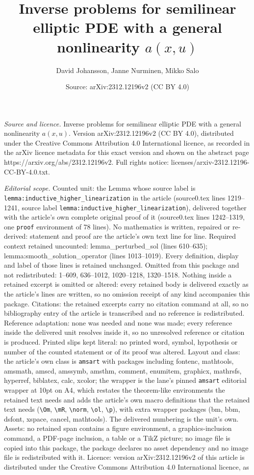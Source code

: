 \documentclass[10pt,a4paper]{amsart}
\title[Inverse problems for semilinear elliptic PDE with a general ]{Inverse problems for semilinear elliptic PDE with a general nonlinearity $a(x,u)$}
\author{David Johansson, Janne Nurminen, Mikko Salo}
\date{Source: arXiv:2312.12196v2 (CC BY 4.0)}
\begin{document}
\maketitle

\noindent\emph{Source and licence.} Inverse problems for semilinear elliptic PDE with a general nonlinearity $a(x,u)$. Version arXiv:2312.12196v2 (CC BY 4.0), distributed under the Creative Commons Attribution 4.0 International licence, as recorded in the arXiv licence metadata for this exact version and shown on the abstract page https://arxiv.org/abs/2312.12196v2. Full rights notice: licenses/arxiv-2312.12196-CC-BY-4.0.txt.\par\smallskip

\noindent\textit{Editorial scope.} Counted unit: the Lemma whose source label is \texttt{lemma:inductive\_higher\_linearization} in the article (source0.tex lines 1219--1241, source label \texttt{lemma:inductive\_higher\_linearization}), delivered together with the article's own complete original proof of it (source0.tex lines 1242--1319, one \texttt{proof} environment of 78 lines). No mathematics is written, repaired or re-derived: statement and proof are the article's own text line for line. Required context retained uncounted: lemma\_perturbed\_sol (lines 610--635); lemma:smooth\_solution\_operator (lines 1013--1019). Every definition, display and label of those lines is retained unchanged. Omitted from this package and not redistributed: 1--609, 636--1012, 1020--1218, 1320--1518. Nothing inside a retained excerpt is omitted or altered: every retained body is delivered exactly as the article's lines are written, so no omission receipt of any kind accompanies this package. Citations: the retained excerpts carry no citation command at all, so no bibliography entry of the article is transcribed and no reference is redistributed. Reference adaptation: none was needed and none was made; every reference inside the delivered unit resolves inside it, so no unresolved reference or citation is produced. Printed slips kept literal: no printed word, symbol, hypothesis or number of the counted statement or of its proof was altered. Layout and class: the article's own class is \texttt{amsart} with packages including fontenc, mathtools, amsmath, amscd, amssymb, amsthm, comment, enumitem, graphicx, mathrsfs, hyperref, biblatex, calc, xcolor; the wrapper is the lane's pinned \texttt{amsart} editorial wrapper at 10pt on A4, which restates the theorem-like environments the retained text needs and adds the article's own macro definitions that the retained text needs (\texttt{\textbackslash Om}, \texttt{\textbackslash mR}, \texttt{\textbackslash norm}, \texttt{\textbackslash ol}, \texttt{\textbackslash p}), with extra wrapper packages (bm, bbm, dsfont, xspace, cancel, mathtools). The delivered numbering is the unit's own. Assets: no retained span contains a figure environment, a graphics-inclusion command, a PDF-page inclusion, a table or a TikZ picture; no image file is copied into this package, the package declares no asset dependency and no image file is redistributed with it. Licence: version arXiv:2312.12196v2 of this article is distributed under the Creative Commons Attribution 4.0 International licence, as 
\end{document}
